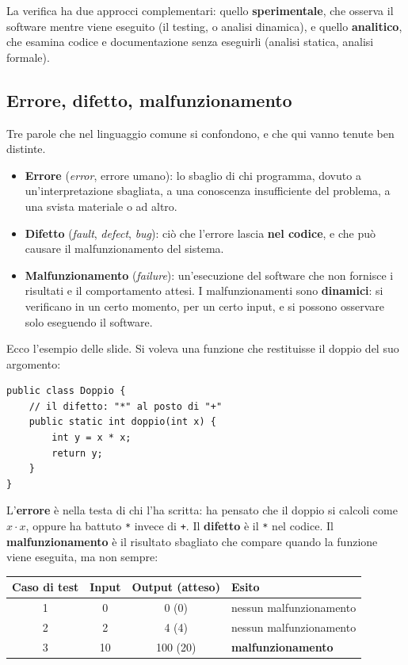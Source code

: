 La verifica ha due approcci complementari: quello \textbf{sperimentale}, che osserva il software mentre viene eseguito
(il testing, o analisi dinamica), e quello \textbf{analitico}, che esamina codice e documentazione senza eseguirli
(analisi statica, analisi formale).

\subsection{Errore, difetto, malfunzionamento}

Tre parole che nel linguaggio comune si confondono, e che qui vanno tenute ben distinte.

\begin{itemize}
  \item \textbf{Errore} (\textit{error}, errore umano): lo sbaglio di chi programma, dovuto a un'interpretazione
        sbagliata, a una conoscenza insufficiente del problema, a una svista materiale o ad altro.
  \item \textbf{Difetto} (\textit{fault}, \textit{defect}, \textit{bug}): ciò che l'errore lascia \textbf{nel codice},
        e che può causare il malfunzionamento del sistema.
  \item \textbf{Malfunzionamento} (\textit{failure}): un'esecuzione del software che non fornisce i risultati e il
        comportamento attesi. I malfunzionamenti sono \textbf{dinamici}: si verificano in un certo momento, per un certo
        input, e si possono osservare solo eseguendo il software.
\end{itemize}

Ecco l'esempio delle slide. Si voleva una funzione che restituisse il doppio del suo argomento:

\begin{lstlisting}[style=java, name=Doppio.java]
public class Doppio {
    // il difetto: "*" al posto di "+"
    public static int doppio(int x) {
        int y = x * x;
        return y;
    }
}
\end{lstlisting}

L'\textbf{errore} è nella testa di chi l'ha scritta: ha pensato che il doppio si calcoli come \(x \cdot x\), oppure ha
battuto \texttt{*} invece di \texttt{+}. Il \textbf{difetto} è il \texttt{*} nel codice. Il \textbf{malfunzionamento} è il
risultato sbagliato che compare quando la funzione viene eseguita, ma non sempre:

\begin{center}
\renewcommand{\arraystretch}{1.25}
\begin{tabular}{cccl}
  \textbf{Caso di test} & \textbf{Input} & \textbf{Output (atteso)} & \textbf{Esito} \\ \hline
  1 & 0 & 0 (0) & nessun malfunzionamento \\
  2 & 2 & 4 (4) & nessun malfunzionamento \\
  3 & 10 & 100 (20) & \textbf{malfunzionamento} \\
\end{tabular}
\end{center}

